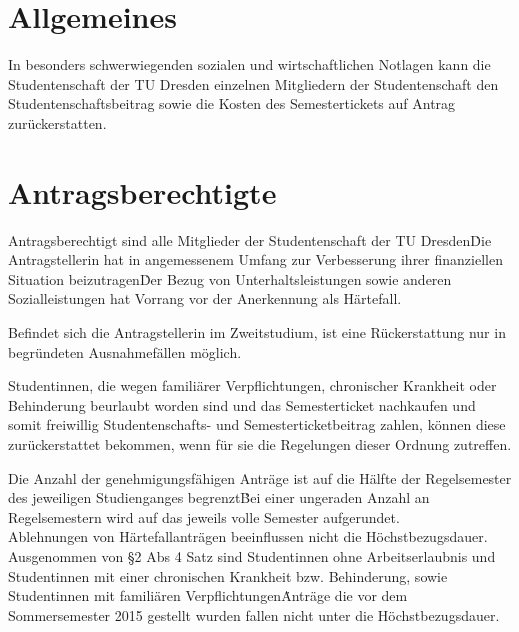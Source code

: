 \setcounter{section}{0}
\begin{multicols}{2}



\section{Allgemeines}
\Abs \Satz In besonders schwerwiegenden sozialen und wirtschaftlichen Notlagen kann die Studentenschaft der TU Dresden einzelnen Mitgliedern der Studentenschaft den Studentenschaftsbeitrag sowie die Kosten des Semestertickets auf Antrag zurückerstatten. 


\section{Antragsberechtigte}
\Abs \Satz Antragsberechtigt sind alle Mitglieder der Studentenschaft der TU Dresden\. Die Antragstellerin hat in angemessenem Umfang zur Verbesserung ihrer finanziellen Situation beizutragen\. Der Bezug von Unterhaltsleistungen sowie anderen Sozialleistungen hat Vorrang vor der Anerkennung als Härtefall.

\Abs \Satz Befindet sich die Antragstellerin im Zweitstudium, ist eine Rückerstattung nur in begründeten Ausnahmefällen möglich.

\Abs \Satz Studentinnen, die wegen familiärer Verpflichtungen, chronischer Krankheit oder Behinderung beurlaubt worden sind und das Semesterticket nachkaufen und somit freiwillig Studentenschafts- und Semesterticketbeitrag zahlen, können diese zurückerstattet bekommen, wenn für sie die Regelungen dieser Ordnung zutreffen.

\Abs \Satz Die Anzahl der genehmigungsfähigen Anträge ist auf die Hälfte der Regelsemester des jeweiligen Studienganges begrenzt\. Bei einer ungeraden Anzahl an Regelsemestern wird auf das jeweils volle Semester aufgerundet.\\
\Satz Ablehnungen von Härtefallanträgen beeinflussen nicht die Höchstbezugsdauer.\\
\Satz Ausgenommen von §2 Abs 4 Satz sind Studentinnen ohne Arbeitserlaubnis und Studentinnen mit einer chronischen Krankheit bzw. Behinderung, sowie Studentinnen mit familiären Verpflichtungen\. 
Anträge die vor dem Sommersemester 2015 gestellt wurden fallen nicht unter die Höchstbezugsdauer.



\end{multicols}
